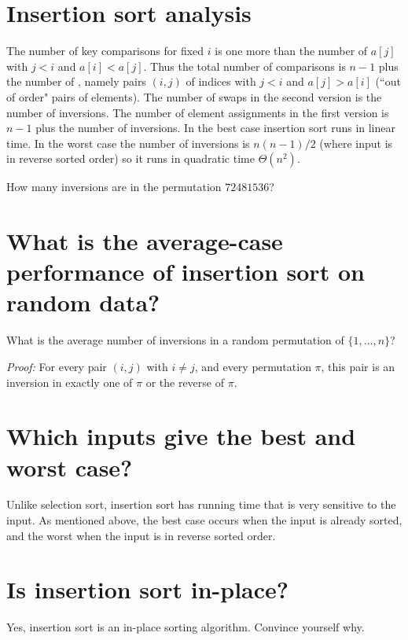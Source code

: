 \section{Insertion sort analysis}
The number of key comparisons for fixed $i$ is one more than the number of $a[j]$ with $j < i$ and $a[i] < a[j]$.
Thus the total number of comparisons is $n-1$ plus the number of , 
namely pairs $(i, j)$ of indices with $j < i$ and $a[j] > a[i]$ (``out of order" pairs of elements).
The number of swaps in the second version is the number of inversions. 
The number of element assignments in the first version is $n-1$ plus the number of inversions.
In the best case insertion sort runs in linear time. 
In the worst case the number of inversions is $n(n-1)/2$ 
(where input is in reverse sorted order) so it runs in quadratic time $\Theta(n^2)$.

\begin{Boxample}[4]
How many inversions are in the permutation $72481536$?
\end{Boxample}

\section{What is the average-case performance of insertion sort on random data?}

\begin{Boxample}[6]
What is the average number of inversions in a random permutation of $\{1,\dots, n\}$?
\end{Boxample}
\textit{Proof:} For every pair $(i,j)$ with $i\neq j$,  and every permutation $\pi$, 
this pair is an inversion in exactly one of $\pi$ or the reverse of $\pi$.
\fi

\section{Which inputs give the best and worst case?}
Unlike selection sort, insertion sort has running time that is very sensitive to the input. 
As mentioned above, the best case occurs when the input is already sorted, and the worst when the input is in reverse sorted order.

\section{Is insertion sort in-place?}
Yes, insertion sort is an in-place sorting algorithm. Convince yourself why.


